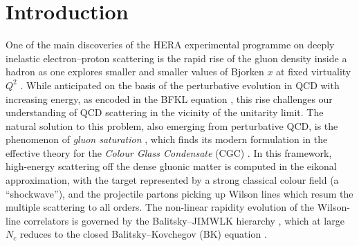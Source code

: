 \documentclass[11pt,a4paper]{article}
\numberwithin{equation}{section}
\begin{document}
\newpage
\tableofcontents
\newpage

\section{Introduction}
\label{sec:intro}

One of the main discoveries of the HERA experimental programme on deeply inelastic
electron--proton scattering is the rapid rise of the gluon density inside a hadron as one
explores smaller and smaller values of Bjorken $x$ at fixed virtuality $Q^2$
\cite{H1:2009pze}. While anticipated on the basis of the perturbative evolution in QCD with
increasing energy, as encoded in the BFKL equation \cite{Kuraev:1977fs,Balitsky:1978ic}, this
rise challenges our understanding of QCD scattering in the vicinity of the unitarity limit. The
natural solution to this problem, also emerging from perturbative QCD, is the phenomenon of
\emph{gluon saturation} \cite{Gribov:1983ivg,Mueller:1985wy}, which finds its modern formulation
in the effective theory for the \emph{Colour Glass Condensate} (CGC)
\cite{McLerran:1993ni,McLerran:1993ka,Gelis:2010nm}. In this framework, high-energy scattering
off the dense gluonic matter is computed in the eikonal approximation, with the target
represented by a strong classical colour field (a ``shockwave''), and the projectile partons
picking up Wilson lines which resum the multiple scattering to all orders. The non-linear
rapidity evolution of the Wilson-line correlators is governed by the Balitsky--JIMWLK hierarchy
\cite{Balitsky:1995ub,JalilianMarian:1997jx,JalilianMarian:1997gr,Kovner:2000pt,Weigert:2000gi,%
Iancu:2000hn,Iancu:2001ad,Ferreiro:2001qy}, which at large $N_c$ reduces to the closed
Balitsky--Kovchegov (BK) equation \cite{Balitsky:1995ub,Kovchegov:1999yj}.
\end{document}
